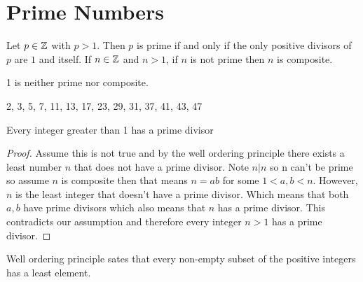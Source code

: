 \section{Prime Numbers}

\begin{definition}
    Let $p \in \mathbb{Z}$ with  $p > 1$. Then $p$ is prime if and only if the only positive divisors of  $p$ are  $1 $ and itself. If $n \in \mathbb{Z}$ and  $n > 1$, if  $n$ is not prime then $n$ is composite.
\end{definition}
\begin{note}
    1 is neither prime nor composite.
\end{note}
\begin{eg}
    2, 3, 5, 7, 11, 13, 17, 23, 29, 31, 37, 41, 43, 47
\end{eg}
\begin{lemma}
    Every integer greater than 1 has a prime divisor
\end{lemma}
\begin{proof}
    Assume this is not true and by the well ordering principle  there exists a least number $n$ that does not have a prime divisor. Note $n | n$ so n can't be prime so assume $n$ is composite then that means  $n = ab$ for some  $1 < a,b < n$. However,  $n$ is the least integer that doesn't have a prime divisor. Which means that both  $a,b$ have prime divisors which also means that  $n$ has a prime divisor. This contradicts our assumption and therefore every integer $n > 1$ has a prime divisor.
\end{proof}
\begin{note}
    Well ordering principle sates that every non-empty subset of the positive integers has a least element.
\end{note}


